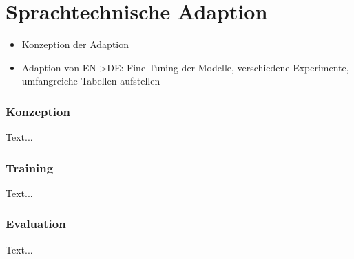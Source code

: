 \chapter{Sprachtechnische Adaption}
\thispagestyle{fancy}
\label{chap:Sprachtechnische Adaption}

\begin{itemize}
	\item Konzeption der Adaption
	\item Adaption von EN->DE: Fine-Tuning der Modelle, verschiedene Experimente, umfangreiche Tabellen aufstellen
\end{itemize}


\subsection{Konzeption}
Text...


\subsection{Training}
Text...


\subsection{Evaluation}
Text...
